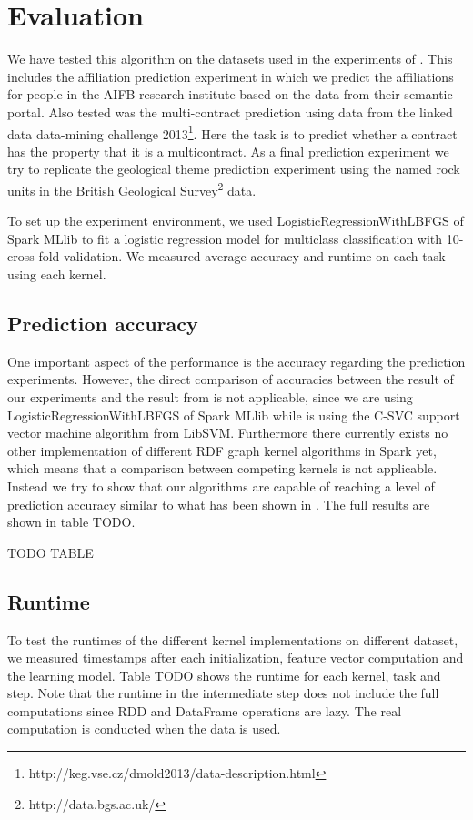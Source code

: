 \documentclass{easychair}
\begin{document}
\section{Evaluation}
\label{sect:Evaluation}

We have tested this algorithm on the datasets used in the experiments of \cite{FGK}. This includes the affiliation prediction experiment in which we predict the affiliations for people in the AIFB research institute based on the data from their semantic portal. Also tested was the multi-contract prediction using data from the linked data data-mining challenge 2013\footnote{http://keg.vse.cz/dmold2013/data-description.html}. Here the task is to predict whether a contract has the property that it is a multicontract. As a final prediction experiment we try to replicate the geological theme prediction experiment using the named rock units in the British Geological Survey\footnote{http://data.bgs.ac.uk/} data.

To set up the experiment environment, we used LogisticRegressionWithLBFGS of Spark MLlib to fit a logistic regression model for multiclass classification with 10-cross-fold validation. We measured average accuracy and runtime on each task using each kernel.

\subsection{Prediction accuracy}
One important aspect of the performance is the accuracy regarding the prediction experiments. However, the direct comparison of accuracies between the result of our experiments and the result from \cite{FGK} is not applicable, since we are using LogisticRegressionWithLBFGS of Spark MLlib while \cite{FGK} is using the C-SVC support vector machine algorithm from LibSVM. Furthermore there currently exists no other implementation of different RDF graph kernel algorithms in Spark yet, which means that a comparison between competing kernels is not applicable. Instead we try to show that our algorithms are capable of reaching a level of prediction accuracy similar to what has been shown in \cite{FGK}. The full results are shown in table TODO.

TODO TABLE

\subsection{Runtime}
To test the runtimes of the different kernel implementations on different dataset, we measured timestamps after each initialization, feature vector computation and the learning model. Table TODO shows the runtime for each kernel, task and step. Note that the runtime in the intermediate step does not include the full computations since RDD and DataFrame operations are lazy. The real computation is conducted when the data is used.
\end{document}
